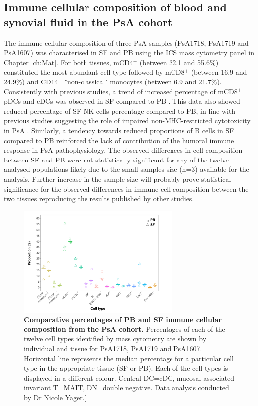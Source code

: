 \subsection{Immune cellular composition of blood and synovial fluid in the PsA cohort}
The immune cellular composition of three PsA samples (PsA1718, PsA1719 and PsA1607) was characterised in SF and PB using the ICS mass cytometry panel in Chapter \ref{ch:Mat}. For both tissues, mCD4$^+$ (between 32.1 and 55.6\%) constituted the most abundant cell type followed by mCD8$^+$ (between 16.9 and 24.9\%) and CD14$^+$ "non-classical" monocytes (between 6.9 and 21.7\%). Consistently with previous studies, a trend of increased percentage of mCD8$^+$ pDCs and cDCs was observed in SF compared to PB \parencite{Ross2000,Jongbloed2006}. This data also showed reduced percentage of SF NK cells percentage compared to PB, in line with previous studies suggesting the role of impaired non-MHC-restricted cytotoxicity in PsA \parencite{Spadaro2004}. Similarly, a tendency towards reduced proportions of B cells in SF compared to PB reinforced the lack of contribution of the humoral immune response in PsA pathophysiology. The observed differences in cell composition between SF and PB were not statistically significant for any of the twelve analysed populations likely due to the small samples size (n=3) available for the analysis. Further increase in the sample size will probably prove statistical significance for the observed differences in immune cell composition between the two tissues reproducing the results published by other studies.   

\begin{figure}[H]
\centering
\includegraphics[width=0.7\textwidth]{./Results3/pdfs/PSA_ATAC_cohort_cell_type_composition_boxplots}
\caption[Comparative percentages of PB and SF immune cellular composition from the PsA cohort.]{\textbf{Comparative percentages of PB and SF immune cellular composition from the PsA cohort.} Percentages of each of the twelve cell types identified by mass cytometry are shown by individual and tissue for PsA1718, PsA1719 and PsA1607. Horizontal line represents the median percentage for a particular cell type in the appropriate tissue (SF or PB). Each of the cell types is displayed in a different colour. Central DC=cDC, mucosal-associated invariant T=MAIT, DN=double negative. Data analysis conducted by Dr Nicole Yager.)}
\label{figure:PsA_cell_composition}
\end{figure}



